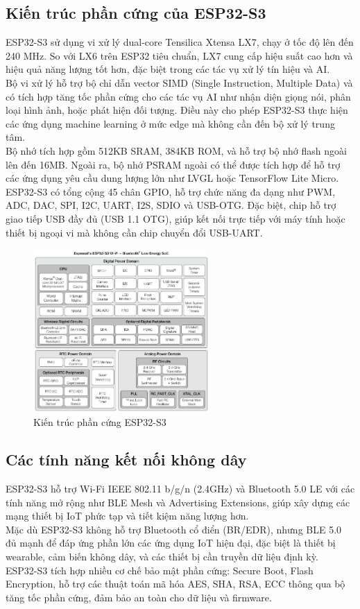 \subsection{Kiến trúc phần cứng của ESP32-S3}
\tab ESP32-S3 sử dụng vi xử lý dual-core Tensilica Xtensa LX7, chạy ở tốc độ lên đến 240 MHz. So với LX6 trên ESP32 tiêu chuẩn, LX7 cung cấp hiệu suất cao hơn và hiệu quả năng lượng tốt hơn, đặc biệt trong các tác vụ xử lý tín hiệu và AI.\\
\tab Bộ vi xử lý hỗ trợ bộ chỉ dẫn vector SIMD (Single Instruction, Multiple Data) và có tích hợp tăng tốc phần cứng cho các tác vụ AI như nhận diện giọng nói, phân loại hình ảnh, hoặc phát hiện đối tượng. Điều này cho phép ESP32-S3 thực hiện các ứng dụng machine learning ở mức edge mà không cần đến bộ xử lý trung tâm.\\
\tab Bộ nhớ tích hợp gồm 512KB SRAM, 384KB ROM, và hỗ trợ bộ nhớ flash ngoài lên đến 16MB. Ngoài ra, bộ nhớ PSRAM ngoài có thể được tích hợp để hỗ trợ các ứng dụng yêu cầu dung lượng lớn như LVGL hoặc TensorFlow Lite Micro.\\ 
\tab ESP32-S3 có tổng cộng 45 chân GPIO, hỗ trợ chức năng đa dạng như PWM, ADC, DAC, SPI, I2C, UART, I2S, SDIO và USB-OTG. Đặc biệt, chip hỗ trợ giao tiếp USB đầy đủ (USB 1.1 OTG), giúp kết nối trực tiếp với máy tính hoặc thiết bị ngoại vi mà không cần chip chuyển đổi USB-UART.
\begin{figure}[H]
  \centering
  \includegraphics[width=0.6\textwidth]{Images/ESP32-S3_2.1.1.jpg}
  \caption{Kiến trúc phần cứng ESP32-S3}
\end{figure}
\subsection{Các tính năng kết nối không dây}
\tab ESP32-S3 hỗ trợ Wi-Fi IEEE 802.11 b/g/n (2.4GHz) và Bluetooth 5.0 LE với các tính năng mở rộng như BLE Mesh và Advertising Extensions, giúp xây dựng các mạng thiết bị IoT phức tạp và tiết kiệm năng lượng hơn.\\
\tab Mặc dù ESP32-S3 không hỗ trợ Bluetooth cổ điển (BR/EDR), nhưng BLE 5.0 đủ mạnh để đáp ứng phần lớn các ứng dụng IoT hiện đại, đặc biệt là thiết bị wearable, cảm biến không dây, và các thiết bị cần truyền dữ liệu định kỳ.\\
\tab ESP32-S3 tích hợp nhiều cơ chế bảo mật phần cứng: Secure Boot, Flash Encryption, hỗ trợ các thuật toán mã hóa AES, SHA, RSA, ECC thông qua bộ tăng tốc phần cứng, đảm bảo an toàn cho dữ liệu và firmware.
